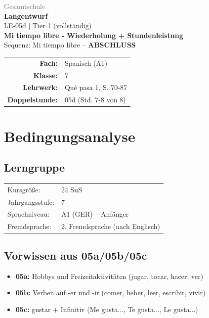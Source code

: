 \documentclass[11pt,a4paper]{article}
\newcommand{\fach}{Spanisch}
\newcommand{\jahrgangsstufe}{7}
\newcommand{\schulart}{Gesamtschule}
\newcommand{\stundenthema}{Mi tiempo libre - Wiederholung + Stundenleistung}
\newcommand{\reihenthema}{Mi tiempo libre}
\newcommand{\stundennummer}{05d}
\newcommand{\lehrwerk}{Qué pasa 1}
\newcommand{\lehrwerkseite}{S. 70-87}
\newcommand{\lerngruppengroesse}{24}
\begin{document}
\begin{titlepage}
    \centering
    \vspace*{2cm}
    {\large\textcolor{gray}{\schulart}}\\[2cm]
    {\Huge\textcolor{fach}{\textbf{Langentwurf}}}\\[0.5cm]
    {\large LE-\stundennummer{} | Tier 1 (vollständig)}\\[2cm]
    {\LARGE\textbf{\stundenthema}}\\[0.5cm]
    {\large Sequenz: \reihenthema{} -- \textbf{ABSCHLUSS}}\\[2cm]
    \begin{tabular}{rl}
        \textbf{Fach:} & \fach{} (A1) \\[0.3cm]
        \textbf{Klasse:} & \jahrgangsstufe \\[0.3cm]
        \textbf{Lehrwerk:} & \lehrwerk, \lehrwerkseite \\[0.3cm]
        \textbf{Doppelstunde:} & \stundennummer{} (Std. 7-8 von 8) \\[0.3cm]
    \end{tabular}
    \vfill
\end{titlepage}

\tableofcontents
\newpage

\section{Bedingungsanalyse}

\subsection{Lerngruppe}
\begin{tabular}{ll}
    Kursgröße: & \lerngruppengroesse{} SuS \\
    Jahrgangsstufe: & \jahrgangsstufe \\
    Sprachniveau: & A1 (GER) -- Anfänger \\
    Fremdsprache: & 2. Fremdsprache (nach Englisch) \\
\end{tabular}

\subsection{Vorwissen aus 05a/05b/05c}
\begin{itemize}
    \item \textbf{05a:} Hobbys und Freizeitaktivitäten (jugar, tocar, hacer, ver)
    \item \textbf{05b:} Verben auf -er und -ir (comer, beber, leer, escribir, vivir)
    \item \textbf{05c:} gustar + Infinitiv (Me gusta..., Te gusta..., Le gusta...)
\end{itemize}
\end{document}
